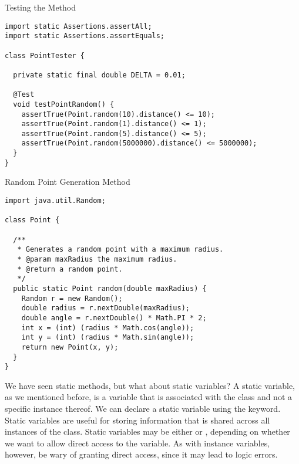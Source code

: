 \begin{cl}[]{Testing the  Method}
\begin{lstlisting}[language=MyJava]
import static Assertions.assertAll;
import static Assertions.assertEquals;

class PointTester {

  private static final double DELTA = 0.01;

  @Test
  void testPointRandom() {
    assertTrue(Point.random(10).distance() <= 10);
    assertTrue(Point.random(1).distance() <= 1);
    assertTrue(Point.random(5).distance() <= 5);
    assertTrue(Point.random(5000000).distance() <= 5000000);
  }
}
\end{lstlisting}
\end{cl}

\begin{cl}[]{Random Point Generation Method}
\begin{lstlisting}[language=MyJava]
import java.util.Random;

class Point {

  /**
   * Generates a random point with a maximum radius.
   * @param maxRadius the maximum radius.
   * @return a random point.
   */
  public static Point random(double maxRadius) {
    Random r = new Random();
    double radius = r.nextDouble(maxRadius);
    double angle = r.nextDouble() * Math.PI * 2;
    int x = (int) (radius * Math.cos(angle));
    int y = (int) (radius * Math.sin(angle));
    return new Point(x, y);
  }
}
\end{lstlisting}
\end{cl}

We have seen static methods, but what about static variables? A static variable, as we mentioned before, is a variable that is associated with the class and not a specific instance thereof. We can declare a static variable using the  keyword. Static variables are useful for storing information that is shared across all instances of the class. Static variables may be either  or , depending on whether we want to allow direct access to the variable. As with instance variables, however, be wary of granting direct access, since it may lead to logic errors.



